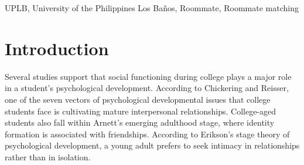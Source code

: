\documentclass[journal]{IEEEtran}
\title{\SPTITLE}
\author{\ADVISEE~and~\ADVISER
\REMARK
}
\newcommand{\UPLB}{University of the Philippines Los Ba\~{n}os }
\begin{document}
\maketitle

\begin{abstract}
    This article explores the role and significance of roommates in a college student's development - from the initial
    adaptation with the roommate setting, to their academic performance and life after college. The importance of
    finding the proper roommates so that a student can maximize their psychological development, get higher grades, and
    develop open-mindedness is highlighted. A solution is proposed in the form of a web application that can help \UPLB
    students find mutually beneficial roommates for their college life. This solution also extends itself to solve the
    dorm-finding problem students experience at the start of every semester.

\end{abstract}

\begin{keywords}
UPLB, University of the Philippines Los Ba\~{n}os, Roommate, Roommate matching
\end{keywords}

\section{Introduction}

    Several studies support that social functioning during college plays a major role in a student's psychological
    development. According to Chickering and Reisser, one of the seven vectors of psychological developmental issues
    that college students face is cultivating mature interpersonal relationships\cite{chickering}. College-aged students
    also fall within Arnett's emerging adulthood stage, where identity formation is associated with
    friendships\cite{erb}. According to Erikson's stage theory of psychological development, a young adult prefers to
    seek intimacy in relationships rather than in isolation\cite{erikson}. 
\end{document}
